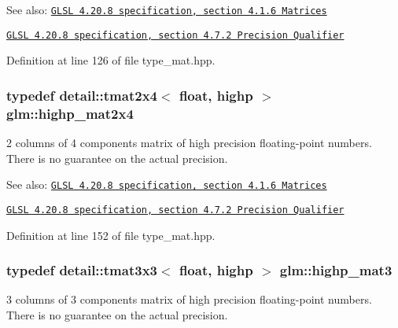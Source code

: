 \begin{Desc}
\item[See also:]\href{http://www.opengl.org/registry/doc/GLSLangSpec.4.20.8.pdf}{\tt GLSL 4.20.8 specification, section 4.1.6 Matrices} 

\href{http://www.opengl.org/registry/doc/GLSLangSpec.4.20.8.pdf}{\tt GLSL 4.20.8 specification, section 4.7.2 Precision Qualifier} \end{Desc}


Definition at line 126 of file type\_\-mat.hpp.\hypertarget{group__core__precision_g3cc506666b7a95db56f9d2eb787b6e20}{
\subsubsection[highp\_\-mat2x4]{\setlength{\rightskip}{0pt plus 5cm}typedef detail::tmat2x4$<$ float, highp $>$ {\bf glm::highp\_\-mat2x4}}}
\label{group__core__precision_g3cc506666b7a95db56f9d2eb787b6e20}


2 columns of 4 components matrix of high precision floating-point numbers. There is no guarantee on the actual precision.

\begin{Desc}
\item[See also:]\href{http://www.opengl.org/registry/doc/GLSLangSpec.4.20.8.pdf}{\tt GLSL 4.20.8 specification, section 4.1.6 Matrices} 

\href{http://www.opengl.org/registry/doc/GLSLangSpec.4.20.8.pdf}{\tt GLSL 4.20.8 specification, section 4.7.2 Precision Qualifier} \end{Desc}


Definition at line 152 of file type\_\-mat.hpp.\hypertarget{group__core__precision_g334034520a655db41a2e188951f6aaad}{
\subsubsection[highp\_\-mat3]{\setlength{\rightskip}{0pt plus 5cm}typedef detail::tmat3x3$<$ float, highp $>$ {\bf glm::highp\_\-mat3}}}
\label{group__core__precision_g334034520a655db41a2e188951f6aaad}


3 columns of 3 components matrix of high precision floating-point numbers. There is no guarantee on the actual precision.

